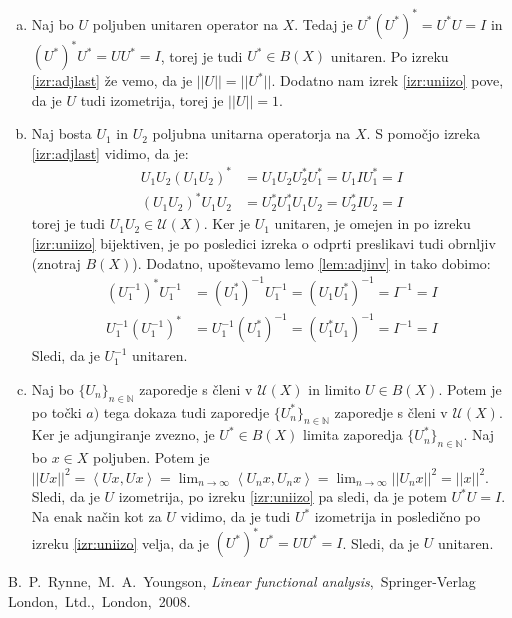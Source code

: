 \documentclass[mat2]{matdelo}
\newcommand{\N}{\mathbb{N}}
\newcommand{\abs}[1]{\ensuremath{\lvert #1 \rvert}}
\newcommand{\norm}[1]{\abs{\abs{#1}}}
\newcommand{\Sp}[2]{\ensuremath{\left<#1, #2\right>}}
\begin{document}
			\begin{dokaz}
				\begin{enumerate}[a)]
					\item Naj bo $U$ poljuben unitaren operator na $X$. Tedaj je $U^*(U^*)^* = U^*U = I$ in $(U^*)^*U^* = UU^* = I$, torej je tudi $U^*\in B(X)$ unitaren. Po izreku \ref{izr:adjlast} že vemo, da je $\norm{U} = \norm{U^*}$. Dodatno nam izrek \ref{izr:uniizo} pove, da je $U$ tudi izometrija, torej je $\norm{U} = 1$.
					\item Naj bosta $U_1$ in $U_2$ poljubna unitarna operatorja na $X$. S pomočjo izreka \ref{izr:adjlast} vidimo, da je: \begin{align*}
						U_1U_2(U_1U_2)^* &= U_1U_2U_2^*U_1^* = U_1IU_1^* = I \\
						(U_1U_2)^*U_1U_2 &= U_2^*U_1^*U_1U_2 = U_2^*IU_2 = I 
					\end{align*} torej je tudi $U_1U_2 \in \mathcal{U}(X)$.
					Ker je $U_1$ unitaren, je omejen in po izreku \ref{izr:uniizo} bijektiven, je po posledici izreka o odprti preslikavi tudi obrnljiv (znotraj $B(X)$). Dodatno, upoštevamo lemo \ref{lem:adjinv} in tako dobimo: \begin{align*}
						(U_1^{-1})^*U_1^{-1} &= (U_1^*)^{-1}U_1^{-1} = (U_1U_1^*)^{-1} = I^{-1} = I \\
						U_1^{-1}(U_1^{-1})^* &= U_1^{-1}(U_1^*)^{-1} = (U_1^*U_1)^{-1} = I^{-1} = I
					\end{align*}
					Sledi, da je $U_1^{-1}$ unitaren.
					\item Naj bo $\{U_n\}_{n\in\N}$ zaporedje s členi v $\mathcal{U}(X)$ in limito $U \in B(X)$. Potem je po točki $a)$ tega dokaza tudi zaporedje $\{U_n^*\}_{n\in\N}$ zaporedje s členi v $\mathcal{U}(X)$. Ker je adjungiranje zvezno, je $U^*\in B(X)$ limita zaporedja $\{U_n^*\}_{n\in\N}$. Naj bo $x\in X$ poljuben. Potem je $\norm{Ux}^2 = \Sp{Ux}{Ux} = \lim_{n\to\infty}\Sp{U_nx}{U_nx} = \lim_{n\to\infty}\norm{U_nx}^2 = \norm{x}^2$. Sledi, da je $U$ izometrija, po izreku \ref{izr:uniizo} pa sledi, da je potem $U^*U = I$. Na enak način kot za $U$ vidimo, da je tudi $U^*$ izometrija in posledično po izreku \ref{izr:uniizo} velja, da je $(U^*)^*U^* = UU^* = I$. Sledi, da je $U$ unitaren.
				\end{enumerate}
			\end{dokaz}
			
	\begin{thebibliography}{99}
		 B.~P.~Rynne,~M.~A.~Youngson, \emph{Linear functional analysis},~Springer-Verlag London,~Ltd.,~London,~2008.
	\end{thebibliography}
	
\end{document}
